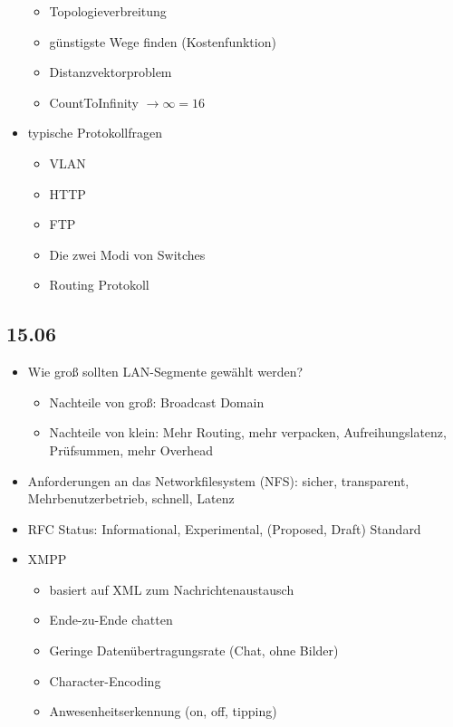 \documentclass{article} %
\begin{document}
\begin{itemize}
\begin{itemize}
			\item Topologieverbreitung
			\item günstigste Wege finden (Kostenfunktion)
			\item Distanzvektorproblem
			\item CountToInfinity $\rightarrow \infty = 16$
		\end{itemize}
		\item typische Protokollfragen
		\begin{itemize}
			\item VLAN
			\item HTTP
			\item FTP
			\item Die zwei Modi von Switches
			\item Routing Protokoll
		\end{itemize}		
	\end{itemize}
	\subsection{15.06}
	\begin{itemize}
		\item Wie groß sollten LAN-Segmente gewählt werden?
		\begin{itemize}
			\item Nachteile von groß: Broadcast Domain
			\item Nachteile von klein: Mehr Routing, mehr verpacken, Aufreihungslatenz, Prüfsummen, mehr Overhead
		\end{itemize}
		\item Anforderungen an das Networkfilesystem (NFS): sicher, transparent, Mehrbenutzerbetrieb, schnell, Latenz
		\item RFC Status: Informational, Experimental, (Proposed, Draft) Standard
		\item XMPP
		\begin{itemize}
			\item basiert auf XML zum Nachrichtenaustausch
			\item Ende-zu-Ende chatten
			\item Geringe Datenübertragungsrate (Chat, ohne Bilder)
			\item Character-Encoding
			\item Anwesenheitserkennung (on, off, tipping)
		\end{itemize}
	\end{itemize}
\end{document}
